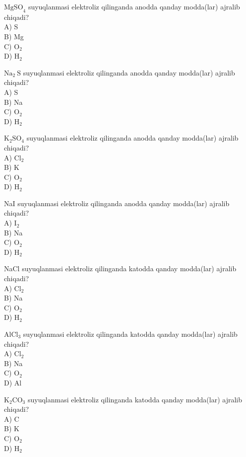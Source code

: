   \item $\mathrm{MgSO}_{4}$ suyuqlanmasi elektroliz qilinganda anodda qanday modda(lar) ajralib chiqadi?\\
A) S\\
B) Mg\\
C) $\mathrm{O}_{2}$\\
D) $\mathrm{H}_{2}$
  \item $\mathrm{Na}_{2} \mathrm{~S}$ suyuqlanmasi elektroliz qilinganda anodda qanday modda(lar) ajralib chiqadi?\\
A) S\\
B) Na\\
C) $\mathrm{O}_{2}$\\
D) $\mathrm{H}_{2}$
  \item $\mathrm{K}_{2} \mathrm{SO}_{4}$ suyuqlanmasi elektroliz qilinganda anodda qanday modda(lar) ajralib chiqadi?\\
A) $\mathrm{Cl}_{2}$\\
B) K\\
C) $\mathrm{O}_{2}$\\
D) $\mathrm{H}_{2}$
  \item NaI suyuqlanmasi elektroliz qilinganda anodda qanday modda(lar) ajralib chiqadi?\\
A) $\mathrm{I}_{2}$\\
B) Na\\
C) $\mathrm{O}_{2}$\\
D) $\mathrm{H}_{2}$
  \item NaCl suyuqlanmasi elektroliz qilinganda katodda qanday modda(lar) ajralib chiqadi?\\
A) $\mathrm{Cl}_{2}$\\
B) Na\\
C) $\mathrm{O}_{2}$\\
D) $\mathrm{H}_{2}$
  \item $\mathrm{AlCl}_{3}$ suyuqlanmasi elektroliz qilinganda katodda qanday modda(lar) ajralib chiqadi?\\
A) $\mathrm{Cl}_{2}$\\
B) Na\\
C) $\mathrm{O}_{2}$\\
D) Al
  \item $\mathrm{K}_{2} \mathrm{CO}_{3}$ suyuqlanmasi elektroliz qilinganda katodda qanday modda(lar) ajralib chiqadi?\\
A) C\\
B) K\\
C) $\mathrm{O}_{2}$\\
D) $\mathrm{H}_{2}$
